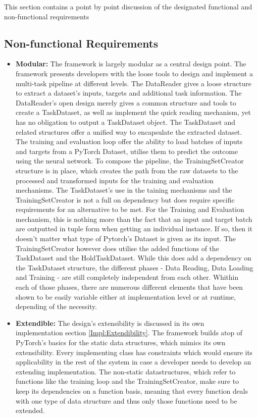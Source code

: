 This section contains a point by point discussion of the designated functional and non-functional requirements

\subsection{Non-functional Requirements}
\begin{itemize}
	\item \textbf{Modular:} 
	The framework is largely modular as a central design point. The framework presents developers with the loose tools to design and implement a multi-task pipeline at different levels. The DataReader gives a loose structure to extract a dataset's inputs, targets and additional task information. The DataReader's open design merely gives a common structure and tools to create a TaskDataset, as well as implement the quick reading mechanism, yet has no obligation to output a TaskDataset object. The TaskDataset and related structures offer a unified way to encapsulate the extracted dataset. The training and evaluation loop offer the ability to load batches of inputs and targets from a PyTorch Dataset, utilise them to predict the outcome using the neural network. To compose the pipeline, the TrainingSetCreator structure is in place, which creates the path from the raw datasets to the processed and transformed inputs for the training and evaluation mechanisms. The TaskDataset's use in the taining mechanisms and the TrainingSetCreator is not a full on dependency but does require specific requirements for an alternative to be met. For the Training and Evaluation mechanism, this is nothing more than the fact that an input and target batch are outputted in tuple form when getting an individual instance. If so, then it doesn't matter what type of Pytorch's Dataset is given as its input. The TrainingSetCreator however does utilise the added functions of the TaskDataset and the HoldTaskDataset. While this does add a dependency on the TaskDataset structure, the different phases - Data Reading, Data Loading and Training - are still completely independent from each other. Whithin each of those phases, there are numerous different elements that have been shown to be easily variable either at implementation level or at runtime, depending of the necessity. \\
	\item \textbf{Extendible:} 
	The design's extensibility is discussed in its own implementation section \ref{Impl:Extendibility}. The framework builds atop of PyTorch's basics for the static data structures, which mimics its own extensibility. Every implementing class has constraints which would ensure its applicability in the rest of the system in case a developer needs to develop an extending implementation. The non-static datastructures, which refer to functions like the training loop and the TrainingSetCreator, make sure to keep its dependencies on a function basis, meaning that every function deals with one type of data structure and thus only those functions need to be extended. 
	

\end{itemize}
